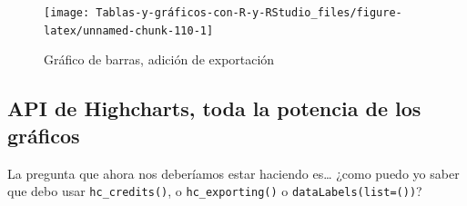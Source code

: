 \documentclass[
]{book}
\newenvironment{Shaded}{\begin{snugshade}}{\end{snugshade}}
\newcommand{\AttributeTok}[1]{\textcolor[rgb]{0.77,0.63,0.00}{#1}}
\newcommand{\ConstantTok}[1]{\textcolor[rgb]{0.00,0.00,0.00}{#1}}
\newcommand{\FunctionTok}[1]{\textcolor[rgb]{0.00,0.00,0.00}{#1}}
\newcommand{\NormalTok}[1]{#1}
\newcommand{\SpecialCharTok}[1]{\textcolor[rgb]{0.00,0.00,0.00}{#1}}
\newcommand{\StringTok}[1]{\textcolor[rgb]{0.31,0.60,0.02}{#1}}
\begin{document}
\begin{Shaded}
\end{Shaded}

\begin{figure}[H]

{\centering \texttt{[image: Tablas-y-gráficos-con-R-y-RStudio\_files/figure-latex/unnamed-chunk-110-1]} 

}

\caption{Gráfico de barras, adición de exportación}\label{fig:unnamed-chunk-110}
\end{figure}

\hypertarget{api-de-highcharts-toda-la-potencia-de-los-gruxe1ficos}{%
\subsection{API de Highcharts, toda la potencia de los gráficos}\label{api-de-highcharts-toda-la-potencia-de-los-gruxe1ficos}}

La pregunta que ahora nos deberíamos estar haciendo es\ldots{} ¿como puedo yo saber que debo usar \texttt{hc\_credits()}, o \texttt{hc\_exporting()} o \texttt{dataLabels(list=())}?
\end{document}
